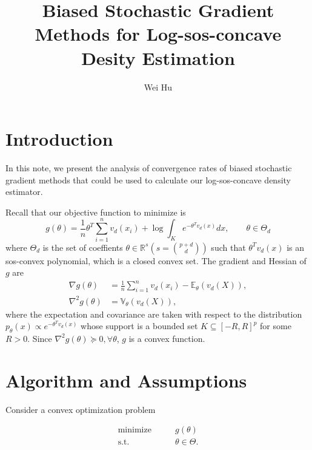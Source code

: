 \documentclass[psamsfonts]{article}
\title{Biased Stochastic Gradient Methods for Log-sos-concave Desity Estimation}
\author{Wei Hu}
\theoremstyle{definition}
\theoremstyle{remark}
\numberwithin{equation} {section}
\begin{document}



\maketitle


\section{Introduction}

In this note, we present the analysis of convergence rates of biased stochastic gradient methods that could be used to calculate our log-sos-concave density estimator.

Recall that our objective function to minimize is
\begin{equation}\label{problem}
g(\theta) = \frac{1}{n} \theta^T \sum_{i = 1}^n v_d( x_i) + \log \int_K e^{-\theta^T v_d(x)} dx,\qquad \theta \in \Theta_d
\end{equation}
where $\Theta_d$ is the set of coeffients $\theta \in \mathbb R^s(s={p + d \choose d})$ such that $\theta^T v_d(x)$ is an sos-convex polynomial, which is a closed convex set. The gradient and Hessian of $g$ are
\begin{align*}
\nabla g(\theta) &= \frac{1}{n} \sum_{i = 1}^n v_d( x_i) - \mathbb E_\theta(v_d(X)),\\
\nabla^2 g(\theta) &= \mathbb V_\theta (v_d(X)),
\end{align*}
where the expectation and covariance are taken with respect to the distribution $p_\theta(x) \propto e^{-\theta^T v_d(x)}$ whose support is a bounded set $K \subseteq [-R, R]^p$ for some $R>0$. Since $\nabla^2 g(\theta) \succeq 0, \forall \theta$, $g$ is a convex function.

\section{Algorithm and Assumptions}
Consider a convex optimization problem

\begin{equation}\label{opt-prob}
\begin{aligned}
\text{minimize} \qquad  &  g(\theta)\\
\text{s.t.}   \qquad &   \theta \in \Theta.
\end{aligned}
\end{equation}
\end{document}
